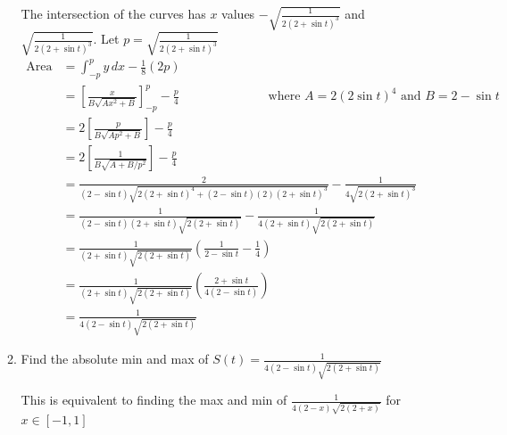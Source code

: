 \documentclass[12pt]{article}
\theoremstyle{definition}
\begin{document}
\begin{enumerate}
\begin{enumerate}
                The intersection of the curves has $x$ values $-\sqrt{\frac{1}{2(2+\sin t)^3}}$ and $\sqrt{\frac{1}{2(2+\sin t)^3}}$. Let $p = \sqrt{\frac{1}{2(2+\sin t)^3}}$
                \begin{align*}
                  \text{Area} &= \int_{-p}^{p}y\,dx - \frac{1}{8}(2p)\\ 
                              &= \left[\frac{x}{B\sqrt{Ax^2+B}} \right]_{-p}^{p} - \frac{p}{4} \hspace{3cm} \text{where } A = 2(2\sin t)^4 \text{ and } B=2-\sin t\\
                              &= 2\left[\frac{p}{B\sqrt{Ap^2+B}} \right] - \frac{p}{4}\\
                              &= 2\left[\frac{1}{B\sqrt{A+B/p^2}} \right] - \frac{p}{4}\\
                              &= \frac{2}{(2-\sin t)\sqrt{2(2+\sin t)^4+(2-\sin t)(2)(2+\sin t)^3}} - \frac{1}{4\sqrt{2(2+\sin t)^3}}\\
                              &= \frac{1}{(2-\sin t)(2+\sin t)\sqrt{2(2+\sin t)}} - \frac{1}{4(2+\sin t)\sqrt{2(2+\sin t)}}\\
                              &= \frac{1}{(2+\sin t)\sqrt{2(2+\sin t)}}\left(\frac{1}{2-\sin t} - \frac{1}{4}\right)\\
                              &= \frac{1}{(2+\sin t)\sqrt{2(2+\sin t)}}\left(\frac{2+\sin t}{4(2-\sin t)}\right)\\
                              &= \frac{1}{4(2-\sin t)\sqrt{2(2+\sin t)}}
                \end{align*}
          \item Find the absolute min and max of $S(t) = \frac{1}{4(2-\sin t)\sqrt{2(2+\sin t)}}$
          
                This is equivalent to finding the max and min of $\frac{1}{4(2-x)\sqrt{2(2+x)}}$ for $x\in [-1,1]$
                

\end{enumerate}
\end{enumerate}
\end{document}
